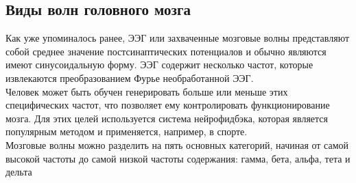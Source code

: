 \documentclass[12pt, a4paper, titlepage]{extreport}
\begin{document}
	\subsection*{Виды волн головного мозга}
	Как уже упоминалось ранее, ЭЭГ или захваченные мозговые волны представляют собой среднее значение постсинаптических потенциалов и обычно являются имеют
	синусоидальную форму. ЭЭГ содержит несколько частот, которые извлекаются преобразованием Фурье необработанной ЭЭГ.\\
	Человек может быть обучен генерировать больше или меньше этих специфических частот, что позволяет ему контролировать функционирование мозга. Для этих целей используется система нейрофидбэка, которая является популярным методом и применяется, например, в спорте.\\
	Мозговые волны можно разделить на пять основных категорий, начиная от самой высокой частоты до самой низкой частоты содержания: гамма, бета, альфа, тета и дельта\\
\end{document}
